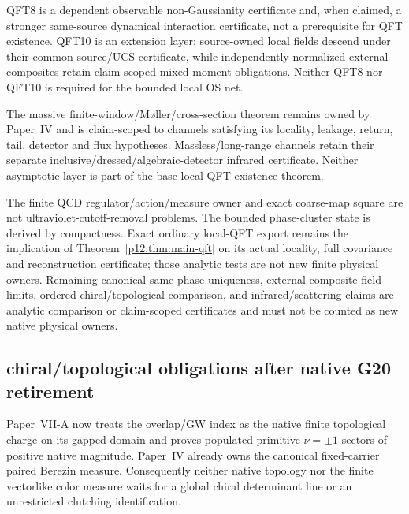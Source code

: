 \documentclass[12pt,a4paper]{article}
\begin{document}
\begin{corollary}
\label{p12:cor:v283-qft8-qft10-status}
QFT8 is a dependent observable non-Gaussianity certificate and, when claimed, a stronger same-source dynamical interaction certificate, not a prerequisite for QFT existence.  QFT10 is an extension layer: source-owned local fields descend under their common source/UCS certificate, while independently normalized external composites retain claim-scoped mixed-moment obligations.  Neither QFT8 nor QFT10 is required for the bounded local OS net.
\end{corollary}

\begin{remark}
The massive finite-window/M\o ller/cross-section theorem remains owned by Paper~IV and is claim-scoped to channels satisfying its locality, leakage, return, tail, detector and flux hypotheses.  Massless/long-range channels retain their separate inclusive/dressed/algebraic-detector infrared certificate.  Neither asymptotic layer is part of the base local-QFT existence theorem.
\end{remark}

\begin{corollary}
\label{p12:cor:v283-continuum-frontier-retyping}
The finite QCD regulator/action/measure owner and exact coarse-map square are not ultraviolet-cutoff-removal problems.  The bounded phase-cluster state is derived by compactness. Exact ordinary
local-QFT export remains the implication of Theorem~\ref{p12:thm:main-qft}
on its actual locality, full covariance and reconstruction certificate;
those analytic tests are not new finite physical owners.  Remaining canonical same-phase uniqueness, external-composite field limits, ordered chiral/topological comparison, and infrared/scattering claims are analytic comparison or claim-scoped certificates and must not be counted as new native physical owners.
\end{corollary}


\subsection{chiral/topological obligations after native G20 retirement}
\label{p12:sec:v282-g20-continuum-reroute}
Paper~VII-A now treats the overlap/GW index as the native finite topological
charge on its gapped domain and proves populated primitive \(\nu=\pm1\)
sectors of positive native magnitude.  Paper~IV already owns the canonical
fixed-carrier paired Berezin measure.  Consequently neither native topology
nor the finite vectorlike color measure waits for a global chiral determinant
line or an unrestricted clutching identification.
\end{document}
